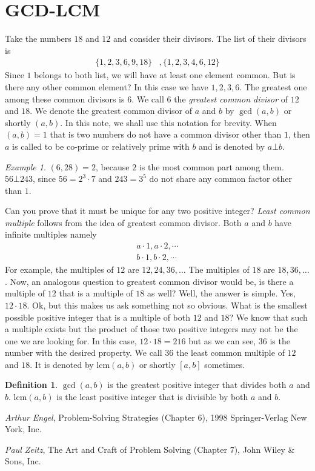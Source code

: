 \documentclass[a4paper, 12pt, leqno]{article}
\theoremstyle{definition}
\newtheorem{definition}{Definition}
\theoremstyle{remark}
\newtheorem*{example}{Example}
\newcommand{\lcm}{\text{lcm}}
\begin{document}
	\section{GCD-LCM}
		Take the numbers $18$ and $12$ and consider their divisors. The list of their divisors is
			\begin{align*}
				\{1,2,3,6,9,18\} & , \{1,2,3,4,6,12\}
			\end{align*}
		Since $1$ belongs to both list, we will have at least one element common. But is there any other common element? In this case we have $1,2,3,6$. The greatest one among these common divisors is $6$. We call $6$ the \textit{greatest common divisor} of $12$ and $18$. We denote the greatest common divisor of $a$ and $b$ by $\gcd(a,b)$ or shortly $(a,b)$. In this note, we shall use this notation for brevity. When $(a,b) = 1$ that is two numbers do not have a common divisor other than $1$, then $a$ is called to be co-prime or relatively
		prime with $b$ and is denoted by $a \bot b$.
			\begin{example}
				$(6,28) = 2$, because $2$ is the most common part among them. $56\bot 243$, since $56=2^3\cdot7$ and $243=3^5$ do not share any common factor other than $1$.
			\end{example}
		Can you prove that it must be unique for any two positive integer? \textit{Least common multiple} follows from the idea of greatest common divisor. Both $a$ and $b$ have infinite multiples namely
			\begin{align*}
				a\cdot1,a\cdot2,\cdots\\
				b\cdot1,b\cdot2,\cdots
			\end{align*}
		For example, the multiples of $12$ are $12,24,36,\ldots$ The multiples of $18$ are $18,36,\ldots$. Now, an analogous question to greatest common divisor would be, is there a multiple of $12$ that is a multiple of $18$ as well? Well, the answer is simple. Yes, $12\cdot18$. Ok, but this makes us ask something not so obvious. What is the smallest possible positive integer that is a multiple of both $12$ and $18$? We know that such a multiple exists but the product of those two positive integers may not be the one we are looking for. In this case, $12\cdot18=216$ but as we can see, $36$ is the number with the desired property. We call $36$ the least common multiple of $12$ and $18$. It is denoted by $\lcm(a,b)$ or shortly $[a,b]$ sometimes.
			\begin{definition}
				$\gcd(a,b)$ is the greatest positive integer that divides both $a$ and $b$. $\lcm(a,b)$ is the least positive integer that is divisible by both $a$ and $b$.
			\end{definition}
	\begin{thebibliography}{99}
		 \textit{Arthur Engel}, Problem-Solving Strategies (Chapter $6$), 1998 Springer-Verlag New York, Inc.
		
		 \textit{Paul Zeitz}, The Art and Craft of Problem Solving (Chapter $7$), John Wiley \& Sons, Inc.
		
	\end{thebibliography}
\end{document}
